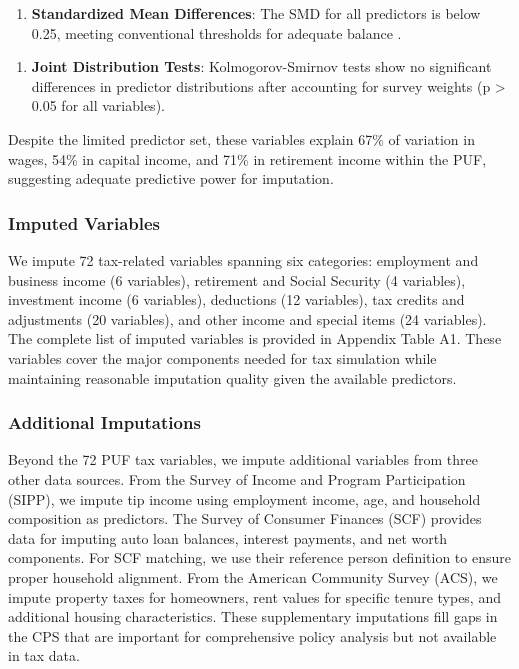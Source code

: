 \begin{enumerate}
\item \textbf{Standardized Mean Differences}: The SMD for all predictors is below 0.25, meeting conventional thresholds for adequate balance \citep{rubin2001}.
\end{enumerate}

\begin{enumerate}
\item \textbf{Joint Distribution Tests}: Kolmogorov-Smirnov tests show no significant differences in predictor distributions after accounting for survey weights (p > 0.05 for all variables).
\end{enumerate}

Despite the limited predictor set, these variables explain 67\% of variation in wages, 54\% in capital income, and 71\% in retirement income within the PUF, suggesting adequate predictive power for imputation.

\subsubsection{Imputed Variables}

We impute 72 tax-related variables spanning six categories: employment and business income (6 variables), retirement and Social Security (4 variables), investment income (6 variables), deductions (12 variables), tax credits and adjustments (20 variables), and other income and special items (24 variables). The complete list of imputed variables is provided in Appendix Table A1. These variables cover the major components needed for tax simulation while maintaining reasonable imputation quality given the available predictors.

\subsubsection{Additional Imputations}

Beyond the 72 PUF tax variables, we impute additional variables from three other data sources. From the Survey of Income and Program Participation (SIPP), we impute tip income using employment income, age, and household composition as predictors. The Survey of Consumer Finances (SCF) provides data for imputing auto loan balances, interest payments, and net worth components. For SCF matching, we use their reference person definition to ensure proper household alignment. From the American Community Survey (ACS), we impute property taxes for homeowners, rent values for specific tenure types, and additional housing characteristics. These supplementary imputations fill gaps in the CPS that are important for comprehensive policy analysis but not available in tax data.

